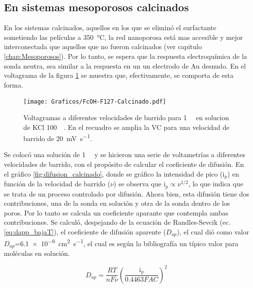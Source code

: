 	\subsection{En sistemas mesoporosos calcinados}

	 En los sistemas calcinados, aquellos en los que se eliminó el surfactante sometiendo las películas a \SI{350}{\celsius}, la red nanoporosa está mas accesible y mejor interconectada que aquellos que no fueron calcinados (ver capitulo \ref{chap:Mesoporosos}). Por lo tanto, se espera que la respuesta electroquímica de la sonda neutra, sea similar a la respuesta en un un electrodo de Au desnudo. En el voltagrama de la figura \ref{fig:fc_calcinado} se muestra que, efectivamente, se comporta de esta forma. 

	 	\begin{figure}[ht]
				\centering
		 	    \texttt{[image: Graficos/FcOH-F127-Calcinado.pdf]}
		        \caption[Voltagrama para \fc\space en \pdm\space calcinadas]{Voltagramas a diferentes velocidades de barrido para \fc\space \SI{1}{\milli\Molar} en solucion de KCl \SI{100}{\milli\Molar}. En el recuadro se amplia la VC para una velocidad de barrido de \SI{20}{\milli\volt\per\second}.}
		        \label{fig:fc_calcinado}
		      	\end{figure}



	 Se colocó una solución de \fc\space \SI{1}{\milli\Molar} y se hicieron una serie de voltametrías a diferentes velocidades de barrido, con el propósito de calcular el coeficiente de difusión. En el gráfico \ref{fig:difusion_calcinado}, donde se gráfico la intensidad de pico (i$_p$) en función de la velocidad de barrido ($\nu$) se observa que $\text{i}_p \propto \nu^{1/2}$, lo que indica que se trata de un proceso controlado por difusión. Ahora bien, esta difusión tiene dos contribuciones, una de la sonda en solución y otra de la sonda dentro de los poros. Por lo tanto se calcula un coeficiente aparante que contempla ambas contribuciones. Se calculó, despejando de la ecuación de Randles-Sevcik (ec. \ref{eq:dapp_bajaT}), el coeficiente de difusión aparente ($D_{ap}$), el cual dió como valor $D_{ap}$=\SI{6,1e-6}{\square\cm\per\second}, el cual es según la bibliografía un típico valor para moléculas en solución. \cite{koryta1993,Otal2006}

		 \begin{equation}
					D_{ap}=\frac{RT}{nF\nu}\left(\frac{\text{i}_p}{0.4463FAC}\right)^2
					\label{eq:dapp_bajaT}
			\end{equation}  
	 

